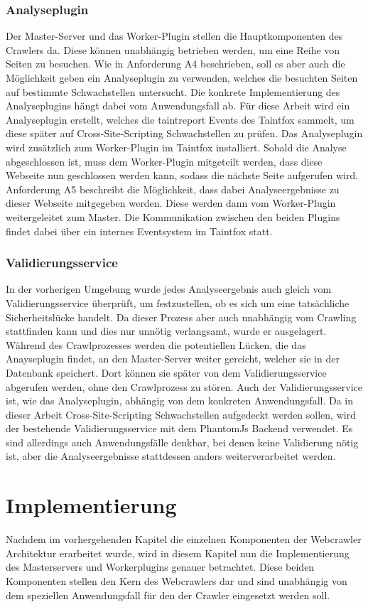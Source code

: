 \subsection{Analyseplugin}
Der Master-Server und das Worker-Plugin stellen die Hauptkomponenten des Crawlers da. Diese können unabhängig betrieben werden, um eine Reihe von Seiten zu besuchen. Wie in Anforderung A4 beschrieben, soll es aber auch die Möglichkeit geben ein Analyseplugin zu verwenden, welches die besuchten Seiten auf bestimmte Schwachstellen untersucht. Die konkrete Implementierung des Analyseplugins hängt dabei vom Anwendungsfall ab. Für diese Arbeit wird ein Analyseplugin erstellt, welches die taintreport Events des Taintfox sammelt, um diese später auf Cross-Site-Scripting Schwachstellen zu prüfen.
Das Analyseplugin wird zusätzlich zum Worker-Plugin im Taintfox installiert. Sobald die Analyse abgeschlossen ist, muss dem Worker-Plugin mitgeteilt werden, dass diese Webseite nun geschlossen werden kann, sodass die nächste Seite aufgerufen wird. Anforderung A5 beschreibt die Möglichkeit, dass dabei Analyseergebnisse zu dieser Webseite mitgegeben werden. Diese werden dann vom Worker-Plugin weitergeleitet zum Master. Die Kommunikation zwischen den beiden Plugins findet dabei über ein internes Eventsystem im Taintfox statt.\\
\subsection{Validierungsservice}
In der vorherigen Umgebung wurde jedes Analyseergebnis auch gleich vom Validierungsservice überprüft, um festzustellen, ob es sich um eine tatsächliche Sicherheitslücke handelt. Da dieser Prozess aber auch unabhängig vom Crawling stattfinden kann und dies nur unnötig verlangsamt, wurde er ausgelagert. Während des Crawlprozesses werden die potentiellen Lücken, die das Anayseplugin findet, an den Master-Server weiter gereicht, welcher sie in der Datenbank speichert. Dort können sie später von dem Validierungsservice abgerufen werden, ohne den Crawlprozess zu stören. Auch der Validierungsservice ist, wie das Analyseplugin, abhängig von dem konkreten Anwendungsfall. Da in dieser Arbeit Cross-Site-Scripting Schwachstellen aufgedeckt werden sollen, wird der bestehende Validierungsservice mit dem PhantomJs Backend verwendet. Es sind allerdings auch Anwendungsfälle denkbar, bei denen keine Validierung nötig ist, aber die Analyseergebnisse stattdessen anders weiterverarbeitet werden.

\chapter{Implementierung}
Nachdem im vorhergehenden Kapitel die einzelnen Komponenten der Webcrawler Architektur erarbeitet wurde, wird in diesem Kapitel nun die Implementierung des Masterservers und Workerplugins genauer betrachtet. Diese beiden Komponenten stellen den Kern des Webcrawlers dar und sind unabhängig von dem speziellen Anwendungsfall für den der Crawler eingesetzt werden soll.
